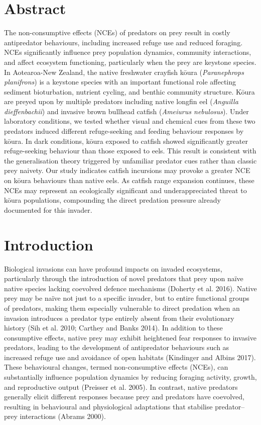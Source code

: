 \documentclass[
  12pt,
  a4paper,
  oneside]{scrbook}
\begin{document}
\section*{Abstract}\label{abstract-1}

The non-consumptive effects (NCEs) of predators on prey result in costly
antipredator behaviours, including increased refuge use and reduced
foraging. NCEs significantly influence prey population dynamics,
community interactions, and affect ecosystem functioning, particularly
when the prey are keystone species. In Aotearoa-New Zealand, the native
freshwater crayfish kōura (\emph{Paranephrops planifrons}) is a keystone
species with an important functional role affecting sediment
bioturbation, nutrient cycling, and benthic community structure. Kōura
are preyed upon by multiple predators including native longfin eel
(\emph{Anguilla dieffenbachii}) and invasive brown bullhead catfish
(\emph{Ameiurus nebulosus}). Under laboratory conditions, we tested
whether visual and chemical cues from these two predators induced
different refuge-seeking and feeding behaviour responses by kōura. In
dark conditions, kōura exposed to catfish showed significantly greater
refuge-seeking behaviour than those exposed to eels. This result is
consistent with the generalisation theory triggered by unfamiliar
predator cues rather than classic prey naivety. Our study indicates
catfish incursions may provoke a greater NCE on kōura behaviours than
native eels. As catfish range expansion continues, these NCEs may
represent an ecologically significant and underappreciated threat to
kōura populations, compounding the direct predation pressure already
documented for this invader.

\section{Introduction}\label{introduction}

Biological invasions can have profound impacts on invaded ecosystems,
particularly through the introduction of novel predators that prey upon
naïve native species lacking coevolved defence mechanisms (Doherty et
al. 2016). Native prey may be naïve not just to a specific invader, but
to entire functional groups of predators, making them especially
vulnerable to direct predation when an invasion introduces a predator
type entirely absent from their evolutionary history (Sih et al. 2010;
Carthey and Banks 2014). In addition to these consumptive effects,
native prey may exhibit heightened fear responses to invasive predators,
leading to the development of antipredator behaviours such as increased
refuge use and avoidance of open habitats (Kindinger and Albins 2017).
These behavioural changes, termed non-consumptive effects (NCEs), can
substantially influence population dynamics by reducing foraging
activity, growth, and reproductive output (Preisser et al. 2005). In
contrast, native predators generally elicit different responses because
prey and predators have coevolved, resulting in behavioural and
physiological adaptations that stabilise predator--prey interactions
(Abrams 2000).
\end{document}
